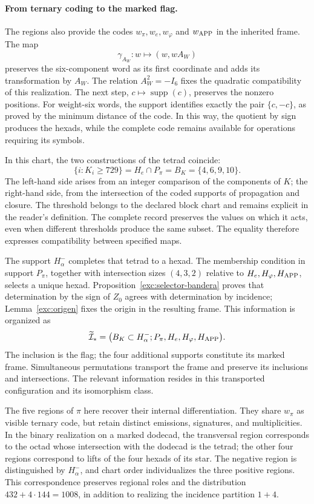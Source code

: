 \paragraph{From ternary coding to the marked flag.}
\label{inc-ampl-bandera}
The regions also provide the codes $w_\pi,w_e,w_\varphi$ and
$w_{\rm APP}$ in the inherited frame. The map
\[
 \gamma_{A_W}:w\longmapsto(w,wA_W)
\]
preserves the six-component word as its first coordinate and adds
its transformation by $A_W$. The relation $A_W^2=-I_6$ fixes
the quadratic compatibility of this realization. The next step,
$c\mapsto\operatorname{supp}(c)$, preserves the nonzero positions.
For weight-six words, the support identifies exactly the pair
$\{c,-c\}$, as proved by the minimum distance of the code. In this way,
the quotient by sign produces the hexads, while the complete code
remains available for operations requiring its symbols.

In this chart, the two constructions of the tetrad coincide:
\begin{equation}
 \{i:K_i\geq729\}
 =H_e\cap P_\pi=B_K=\{4,6,9,10\}.
 \label{inc-ampl-cuaterna}
\end{equation}
The left-hand side arises from an integer comparison of the components
of $K$; the right-hand side, from the intersection of the coded supports of
propagation and closure. The threshold belongs to the declared block
chart and remains explicit in the reader's definition. The
complete record preserves the values on which it acts, even when
different thresholds produce the same subset. The equality therefore
expresses compatibility between specified maps.

The support $H^-_\alpha$ completes that tetrad to a hexad.
The membership condition in support $P_\pi$, together with intersection
sizes $(4,3,2)$ relative to $H_e,H_\varphi,H_{\rm APP}$,
selects a unique hexad. Proposition~\ref{exc:selector-bandera}
proves that determination by the sign of $Z_0$ agrees with determination
by incidence; Lemma~\ref{exc:origen} fixes the origin in the resulting
frame. This information is organized as
\begin{equation}
 \widetilde{\mathcal I}_*
 =\bigl(B_K\subset H^-_\alpha;
         P_\pi,H_e,H_\varphi,H_{\rm APP}\bigr).
 \label{inc-ampl-marco}
\end{equation}
The inclusion is the flag; the four additional supports constitute
its marked frame. Simultaneous permutations transport the frame and
preserve its inclusions and intersections. The relevant information resides
in this transported configuration and its isomorphism class.

The five regions of $\pi$ here recover their internal differentiation.
They share $w_\pi$ as visible ternary code, but retain distinct emissions,
signatures, and multiplicities. In the binary realization on a
marked dodecad, the transversal region corresponds to the octad whose
intersection with the dodecad is the tetrad; the other four regions
correspond to lifts of the four hexads of its star. The
negative region is distinguished by $H^-_\alpha$, and chart order
individualizes the three positive regions. This correspondence preserves
regional roles and the distribution $432+4\cdot144=1008$, in addition
to realizing the incidence partition $1+4$.
